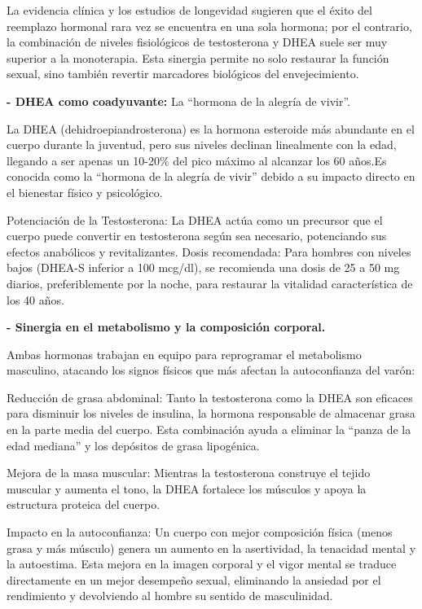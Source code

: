 \documentclass[
  spanish,
]{article}
\begin{document}
La evidencia clínica y los estudios de longevidad sugieren que el éxito del reemplazo hormonal rara vez se encuentra en una sola hormona; por el contrario, la combinación de niveles fisiológicos de testosterona y DHEA suele ser muy superior a la monoterapia. Esta sinergia permite no solo restaurar la función sexual, sino también revertir marcadores biológicos del envejecimiento.

\textbf{- DHEA como coadyuvante:} La ``hormona de la alegría de vivir''.

La DHEA (dehidroepiandrosterona) es la hormona esteroide más abundante en el cuerpo durante la juventud, pero sus niveles declinan linealmente con la edad, llegando a ser apenas un 10-20\% del pico máximo al alcanzar los 60 años.Es conocida como la ``hormona de la alegría de vivir'' debido a su impacto directo en el bienestar físico y psicológico.

Potenciación de la Testosterona: La DHEA actúa como un precursor que el cuerpo puede convertir en testosterona según sea necesario, potenciando sus efectos anabólicos y revitalizantes.
Dosis recomendada: Para hombres con niveles bajos (DHEA-S inferior a 100 mcg/dl), se recomienda una dosis de 25 a 50 mg diarios, preferiblemente por la noche, para restaurar la vitalidad característica de los 40 años.

\textbf{- Sinergia en el metabolismo y la composición corporal.}

Ambas hormonas trabajan en equipo para reprogramar el metabolismo masculino, atacando los signos físicos que más afectan la autoconfianza del varón:

Reducción de grasa abdominal: Tanto la testosterona como la DHEA son eficaces para disminuir los niveles de insulina, la hormona responsable de almacenar grasa en la parte media del cuerpo. Esta combinación ayuda a eliminar la ``panza de la edad mediana'' y los depósitos de grasa lipogénica.

Mejora de la masa muscular: Mientras la testosterona construye el tejido muscular y aumenta el tono, la DHEA fortalece los músculos y apoya la estructura proteica del cuerpo.

Impacto en la autoconfianza: Un cuerpo con mejor composición física (menos grasa y más músculo) genera un aumento en la asertividad, la tenacidad mental y la autoestima. Esta mejora en la imagen corporal y el vigor mental se traduce directamente en un mejor desempeño sexual, eliminando la ansiedad por el rendimiento y devolviendo al hombre su sentido de masculinidad.
\end{document}
